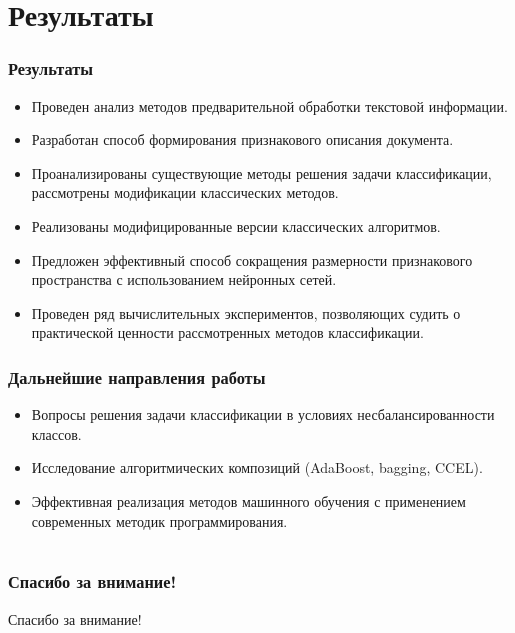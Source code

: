 \documentclass{beamer}
\begin{document}
\section{Результаты}
\begin{frame}
\end{frame}

\begin{frame}
\frametitle{Результаты}
\begin{itemize}
	\item{Проведен анализ методов предварительной обработки текстовой информации.}
	\item{Разработан способ формирования признакового описания документа.}
	\item{Проанализированы существующие методы решения задачи классификации, рассмотрены модификации классических методов.}
	\item{Реализованы модифицированные версии классических алгоритмов.}
	\item{Предложен эффективный способ сокращения размерности признакового пространства с использованием нейронных сетей.}
	\item{Проведен ряд вычислительных экспериментов, позволяющих судить о практической ценности рассмотренных методов классификации.}
\end{itemize}
\end{frame}

\begin{frame}
\frametitle{Дальнейшие направления работы}
\begin{itemize}
	\item{Вопросы решения задачи классификации в условиях несбалансированности классов.}
	\item{Исследование алгоритмических композиций (AdaBoost, bagging, CCEL).}
	\item{Эффективная реализация методов машинного обучения с применением современных методик программирования.}
\end{itemize}

\end{frame}


\section{}
\begin{frame}
\frametitle{Спасибо за внимание!}
	\begin{center}
		Спасибо за внимание!
	\end{center}
\end{frame}
\end{document}
